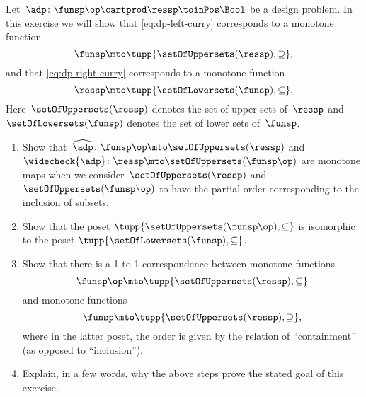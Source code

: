 \begin{gradedexercise}
    \label{ex:CurryingDesignProblems}
    Let~$\adp\colon \funsp\op \cartprod \ressp\toinPos \Bool$ be a design problem.
    In this exercise we will show that \cref{eq:dp-left-curry} corresponds to a monotone function
    \begin{equation}
        \funsp \mto \tupp{\setOfUppersets (\ressp), \supseteq},
    \end{equation}
    and that \cref{eq:dp-right-curry} corresponds to a monotone function
    \begin{equation}
        \ressp \mto \tupp{\setOfLowersets(\funsp), \subseteq}.
    \end{equation}
    Here~$\setOfUppersets (\ressp)$ denotes the set of upper sets of~$\ressp$ and~$\setOfLowersets(\funsp)$ denotes the set of lower sets of~$\funsp$.

    \begin{enumerate}
        \item Show that~$\widehat{\adp} \colon \funsp\op \mto \setOfUppersets (\ressp)$ and~$\widecheck{\adp} \colon \ressp \mto \setOfUppersets (\funsp\op)$ are monotone maps when we consider~$\setOfUppersets (\ressp)$ and~$\setOfUppersets (\funsp\op)$ to have the partial order corresponding to the inclusion of subsets.
        \item Show that the poset $\tupp{\setOfUppersets (\funsp\op), \subseteq}$ is isomorphic to the poset $\tupp{\setOfLowersets(\funsp), \subseteq}$.
        \item Show that there is a 1-to-1 correspondence between monotone functions
              \begin{equation}
                  \funsp\op \mto \tupp{\setOfUppersets (\ressp), \subseteq}
              \end{equation}
              and monotone functions
              \begin{equation}
                  \funsp \mto \tupp{\setOfUppersets (\ressp), \supseteq},
              \end{equation}
              where in the latter poset, the order is given by the relation of ``containment'' (as opposed to ``inclusion'').
        \item Explain, in a few words, why the above steps prove the stated goal of this exercise.
    \end{enumerate}
\end{gradedexercise}

